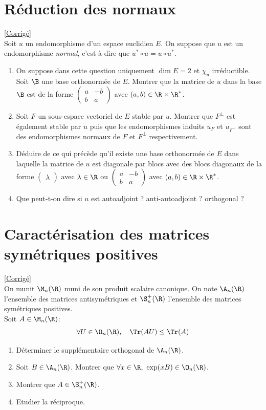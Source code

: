 \documentclass[8pt]{book}
\begin{document}
\section{Réduction des normaux}
\label{Réduction des normaux}
\textcolor{blue}{\hyperref[Réduction des normaux corrigé]{[Corrigé]}}\\
Soit $u$ un endomorphisme d'un espace euclidien $E$. On suppose que $u$ est un endomorphisme \textit{normal}, c'est-à-dire que $u^*\circ u=u\circ u^*$.
\begin{enumerate}
	\item On suppose dans cette question uniquement $\dim E=2$ et $\chi_u$ irréductible. Soit $\B$ une base orthonormée de $E$. Montrer que la matrice de $u$ dans la base $\B$ est de la forme $\begin{pmatrix}
		a&-b\\
		b&a
	\end{pmatrix}$ avec $(a,b)\in \R\times \R^*$.
	\item Soit $F$ un sous-espace vectoriel de $E$ stable par $u$. Montrer que $F^\bot$ est également stable par $u$ puis que les endomorphismes induits $u_F$ et $u_{F^\bot}$ sont des endomorphismes normaux de $F$ et $F^\bot$ respectivement.
	\item Déduire de ce qui précède qu'il existe une base orthonormée de $E$ dans laquelle la matrice de $u$ est diagonale par blocs avec des blocs diagonaux de la forme $\begin{pmatrix}\lambda\end{pmatrix}$ avec $\lambda\in \R$ ou $\begin{pmatrix}
		a&-b\\
		b&a
	\end{pmatrix}$ avec $(a,b)\in \R\times \R^*$.
	\item Que peut-t-on dire si $u$ est autoadjoint ? anti-autoadjoint ? orthogonal ?
\end{enumerate}

\section{Caractérisation des matrices symétriques positives }
\label{Caractérisation des matrices symétriques positives}
\textcolor{blue}{\hyperref[Caractérisation des matrices symétriques positives corrigé]{[Corrigé]}}\\
On munit $\M_n(\R)$ muni de son produit scalaire canonique. On note $\A_n(\R)$ l'ensemble des matrices antisymétriques et $\S_n^+(\R)$ l'ensemble des matrices symétriques positives.
\\ Soit $A\in\M_n(\R)$: $$\forall U\in\O_n(\R), \quad \Tr(AU)\leq\Tr(A)$$
\begin{enumerate}
	\item Déterminer le supplémentaire orthogonal de $\A_n(\R)$.
	\item Soit $B\in\A_n(\R)$. Montrer que $\forall x\in\R,\ \exp(xB)\in\O_n(\R)$.
	\item Montrer que $A\in\S_n^+(\R)$.
	\item Etudier la réciproque.
\end{enumerate}
\end{document}
